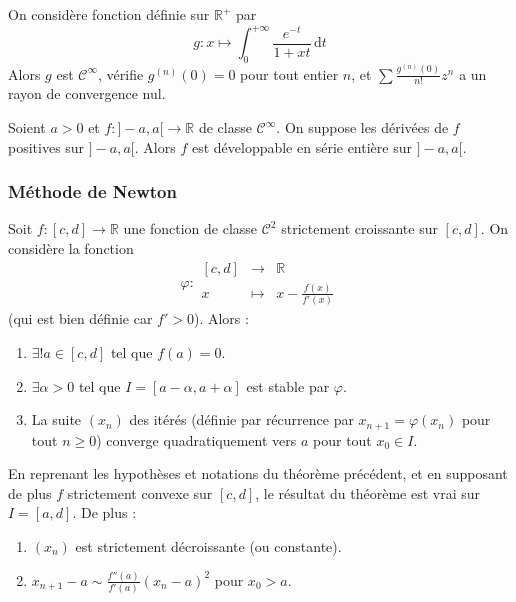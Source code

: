 	\begin{cexample}
		On considère fonction définie sur $\mathbb{R}^+$ par
		\[ g : x \mapsto \int_0^{+\infty} \frac{e^{-t}}{1+xt} \, \mathrm{d}t \]
		Alors $g$ est $\mathcal{C}^\infty$, vérifie $g^{(n)}(0) = 0$ pour tout entier $n$, et $\sum \frac{g^{(n)}(0)}{n!} z^n$ a un rayon de convergence nul.
	\end{cexample}


	\begin{theorem}[Bernstein]
		Soient $a > 0$ et $f : ]-a,a[ \rightarrow \mathbb{R}$ de classe $\mathcal{C}^\infty$. On suppose les dérivées de $f$ positives sur $]-a,a[$. Alors $f$ est développable en série entière sur $]-a,a[$.
	\end{theorem}

	\subsubsection{Méthode de Newton}


	\begin{theorem}
		Soit $f : [c, d] \rightarrow \mathbb{R}$ une fonction de classe $\mathcal{C}^2$ strictement croissante sur $[c, d]$. On considère la fonction
		\[ \varphi :
		\begin{array}{ccc}
			[c, d] &\rightarrow& \mathbb{R} \\
			x &\mapsto& x - \frac{f(x)}{f'(x)}
		\end{array}
		\]
		(qui est bien définie car $f' > 0$). Alors :
		\begin{enumerate}[label=(\roman*)]
			\item $\exists! a \in [c, d]$ tel que $f(a) = 0$.
			\item $\exists \alpha > 0$ tel que $I = [a - \alpha, a + \alpha]$ est stable par $\varphi$.
			\item La suite $(x_n)$ des itérés (définie par récurrence par $x_{n+1} = \varphi(x_n)$ pour tout $n \geq 0$) converge quadratiquement vers $a$ pour tout $x_0 \in I$.
		\end{enumerate}
	\end{theorem}

	\begin{corollary}
		En reprenant les hypothèses et notations du théorème précédent, et en supposant de plus $f$ strictement convexe sur $[c, d]$, le résultat du théorème est vrai sur $I = [a, d]$. De plus :
		\begin{enumerate}[label=(\roman*)]
			\item $(x_n)$ est strictement décroissante (ou constante).
			\item $x_{n+1} - a \sim \frac{f''(a)}{f'(a)} (x_n - a)^2$ pour $x_0 > a$.
		\end{enumerate}
	\end{corollary}

